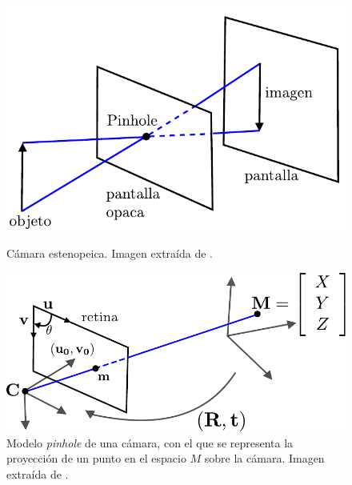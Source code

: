 \begin{figure}[ht!]
\hspace{-0.6cm}
\begin{minipage}[t]{.45\textwidth}
\begin{center}
\includegraphics[scale=0.5]{img/calibracion/pinhole_camara}
\end{center}
\caption{Cámara estenopeica. Imagen extraída de \cite{faugeras_libro}.}
\label{pinhole_camara}
\end{minipage}
\hspace{0.8cm}
\begin{minipage}[t]{.550\textwidth}
\begin{center}
\includegraphics[scale=0.55]{img/calibracion/pinhole_modelo}
\end{center}
\caption{Modelo \textit{pinhole} de una cámara, con el que se representa la proyección de un punto en el espacio $M$ sobre la cámara. Imagen extraída de \cite{zhang_libro}.}
\label{pinhole_modelo}
\end{minipage}
\hfill
\end{figure}


